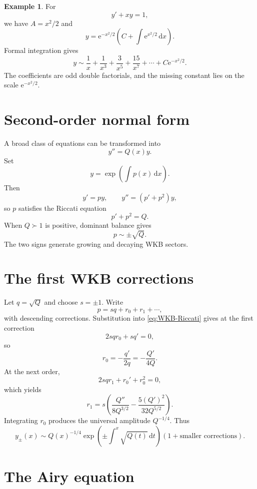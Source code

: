 \documentclass[11pt,openany]{book}
\theoremstyle{definition}
\newtheorem{example}{Example}[chapter]
\theoremstyle{plain}
\theoremstyle{remark}
\newcommand{\dd}{\,\mathrm{d}}
\newcommand{\e}{\mathrm{e}}
\newcommand{\asym}{\sim}
\newcommand{\succdom}{\succ}
\begin{document}
\begin{example}
For
\[
 y'+xy=1,
\]
we have $A=x^2/2$ and
\[
 y=\e^{-x^2/2}
 \left(C+\int\e^{x^2/2}\dd x\right).
\]
Formal integration gives
\[
 y\asym\frac1x+\frac1{x^3}+\frac3{x^5}
 +\frac{15}{x^7}+\cdots+C\e^{-x^2/2}.
\]
The coefficients are odd double factorials, and the missing constant lies on the scale $\e^{-x^2/2}$.
\end{example}

\section{Second-order normal form}

A broad class of equations can be transformed into
\begin{equation}\label{eq:WKB-normal}
 y''=Q(x)y.
\end{equation}
Set
\[
 y=\exp\left(\int p(x)\dd x\right).
\]
Then
\[
 y' =py,
 \qquad
 y''=(p'+p^2)y,
\]
so $p$ satisfies the Riccati equation
\begin{equation}\label{eq:WKB-Riccati}
 p'+p^2=Q.
\end{equation}
When $Q\succdom1$ is positive, dominant balance gives
\[
 p\asym\pm\sqrt Q.
\]
The two signs generate growing and decaying WKB sectors.

\section{The first WKB corrections}

Let $q=\sqrt Q$ and choose $s=\pm1$. Write
\[
 p=sq+r_0+r_1+\cdots,
\]
with descending corrections. Substitution into \cref{eq:WKB-Riccati} gives at the first correction
\[
 2sq r_0+sq'=0,
\]
so
\begin{equation}\label{eq:WKB-r0}
 r_0=-\frac{q'}{2q}=-\frac{Q'}{4Q}.
\end{equation}
At the next order,
\[
 2sq r_1+r_0'+r_0^2=0,
\]
which yields
\begin{equation}\label{eq:WKB-r1}
 r_1=s\left(
 \frac{Q''}{8Q^{3/2}}-
 \frac{5(Q')^2}{32Q^{5/2}}
 \right).
\end{equation}
Integrating $r_0$ produces the universal amplitude $Q^{-1/4}$. Thus
\begin{equation}\label{eq:WKB-leading}
 y_{\pm}(x)\asym
 Q(x)^{-1/4}
 \exp\left(\pm\int^x\sqrt{Q(t)}\dd t\right)
 \left(1+\text{smaller corrections}\right).
\end{equation}

\section{The Airy equation}
\end{document}
